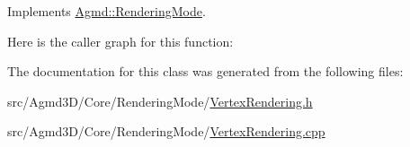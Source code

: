 Implements \hyperlink{class_agmd_1_1_rendering_mode_a725fdff706bd725df5b4ab3caadbaf02}{Agmd\+::\+Rendering\+Mode}.



Here is the caller graph for this function\+:




The documentation for this class was generated from the following files\+:\begin{DoxyCompactItemize}
\item 
src/\+Agmd3\+D/\+Core/\+Rendering\+Mode/\hyperlink{_vertex_rendering_8h}{Vertex\+Rendering.\+h}\item 
src/\+Agmd3\+D/\+Core/\+Rendering\+Mode/\hyperlink{_vertex_rendering_8cpp}{Vertex\+Rendering.\+cpp}\end{DoxyCompactItemize}

